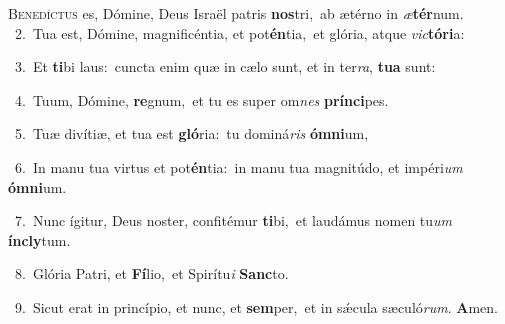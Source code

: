 \lettrine{\initial\textcolor{\initialcolor}{B}}{enedíctus} es, Dómine, Deus Israël patris \textbf{nos}\-tri,~\star ab ætérno in \textit{æ}\-\textbf{tér}num.\\
{\numbfont\textcolor{\numbcolor}{~2.}}~Tua est, Dómine, magnificéntia, et pot\-\textbf{én}\-tia,~\star et glória, atque \textit{vic}\-\textbf{tó}\textbf{ri}a:\par
{\numbfont\textcolor{\numbcolor}{~3.}}~Et \textbf{ti}\-bi laus:~\star cuncta enim quæ in cælo sunt, et in ter\-\textit{ra}\-, \textbf{tu}\-\textbf{a} sunt:\par
{\numbfont\textcolor{\numbcolor}{~4.}}~Tuum, Dómine, \textbf{re}\-gnum,~\star et tu es super om\textit{nes} \textbf{prín}\-\textbf{ci}pes.\par
{\numbfont\textcolor{\numbcolor}{~5.}}~Tuæ divítiæ, et tua est \textbf{gló}\-ria:~\star tu dominá\textit{ris} \textbf{óm}\-\textbf{ni}um,\par
{\numbfont\textcolor{\numbcolor}{~6.}}~In manu tua virtus et pot\-\textbf{én}\-tia:~\star in manu tua magnitúdo, et impéri\textit{um} \textbf{óm}\-\textbf{ni}um.\par
{\numbfont\textcolor{\numbcolor}{~7.}}~Nunc ígitur, Deus noster, confitémur \textbf{ti}\-bi,~\star et laudámus nomen tu\textit{um} \textbf{ín}\-\textbf{cly}tum.\par
{\numbfont\textcolor{\numbcolor}{~8.}}~Glória Patri, et \textbf{Fí}\-lio,~\star et Spirítu\textit{i} \textbf{Sanc}\-to.\par
{\numbfont\textcolor{\numbcolor}{~9.}}~Sicut erat in princípio, et nunc, et \textbf{sem}\-per,~\star et in sǽcula sæculó\-\textit{rum}\-. \textbf{A}\-men.\par
